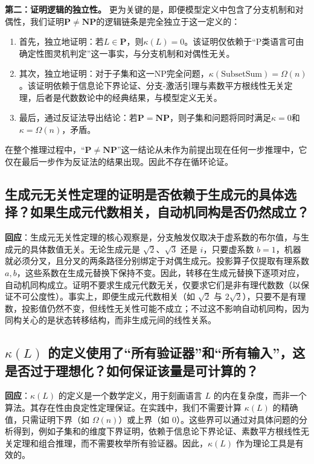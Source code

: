 \documentclass{ctexart}
\begin{document}
	\textbf{第二：证明逻辑的独立性。} 更为关键的是，即便模型定义中包含了分支机制和对偶性，我们证明$\mathbf{P}\neq\mathbf{NP}$的逻辑链条是完全独立于这一定义的：
	\begin{enumerate}
		\item 首先，独立地证明：若$L\in\mathbf{P}$，则$\kappa(L)=0$。该证明仅依赖于``P类语言可由确定性图灵机判定''这一事实，与分支机制和对偶性无关。
		\item 其次，独立地证明：对于子集和这一NP完全问题，$\kappa(\mathrm{SubsetSum})=\Omega(n)$。该证明依赖于信息论下界论证、分支-激活引理与素数平方根线性无关定理，后者是代数数论中的经典结果，与模型定义无关。
		\item 最后，通过反证法导出结论：若$\mathbf{P}=\mathbf{NP}$，则子集和问题将同时满足$\kappa=0$和$\kappa=\Omega(n)$，矛盾。
	\end{enumerate}
	在整个推理过程中，``$\mathbf{P}\neq\mathbf{NP}$''这一结论从未作为前提出现在任何一步推理中，它仅在最后一步作为反证法的结果出现。因此不存在循环论证。
	
	
	\subsection{生成元无关性定理的证明是否依赖于生成元的具体选择？如果生成元代数相关，自动机同构是否仍然成立？}
	
	\textbf{回应}：生成元无关性定理的核心观察是，分支触发仅取决于虚系数的布尔值，与生成元的具体数值无关。无论生成元是 $\sqrt{2}$、$\sqrt{3}$ 还是 $i$，只要虚系数 $b=1$，机器就必须分叉，且分叉的两条路径分别绑定于对偶生成元。投影算子仅提取有理系数 $a, b$，这些系数在生成元替换下保持不变。因此，转移在生成元替换下逐项对应，自动机同构成立。证明不要求生成元代数无关，仅要求它们是非有理代数数（以保证不可公度性）。事实上，即便生成元代数相关（如 $\sqrt{2}$ 与 $2\sqrt{2}$），只要不是有理数，投影值仍然不变，但线性无关性可能不成立；不过这不影响自动机同构，因为同构关心的是状态转移结构，而非生成元间的线性关系。
	
	
	\subsection{$\kappa(L)$ 的定义使用了``所有验证器''和``所有输入''，这是否过于理想化？如何保证该量是可计算的？}
	
	\textbf{回应}：$\kappa(L)$ 的定义是一个数学定义，用于刻画语言 $L$ 的内在复杂度，而非一个算法。其存在性由良定性定理保证。在实践中，我们不需要计算 $\kappa(L)$ 的精确值，只需证明下界（如 $\Omega(n)$）或上界（如 $0$）。这些界可以通过对具体问题的分析得到，例如子集和的维度下界证明，依赖于信息论下界论证、素数平方根线性无关定理和组合推理，而不需要枚举所有验证器。因此，$\kappa(L)$ 作为理论工具是有效的。
	
\end{document}
